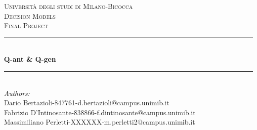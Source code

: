 \begin{titlepage}

\newcommand{\HRule}{\rule{\linewidth}{0.5mm}} %

\center %
 

\textsc{\LARGE Università degli studi di Milano-Bicocca}\\[1cm] %
\textsc{\Large Decision Models}\\[0.3cm] %
\textsc{\large Final Project}\\[0.1cm] %


\HRule \\[0.4cm]
{ \huge \bfseries Q-ant \& Q-gen}\\[0.4cm] %
\HRule \\[1.5cm]
 

\large
\emph{Authors:}\\
Dario Bertazioli-847761-d.bertazioli@campus.unimib.it \\   %
Fabrizio D'Intinosante-838866-f.dintinosante@campus.unimib.it \\
Massimiliano Perletti-XXXXXX-m.perletti2@campus.unimib.it\\[1cm] %




\end{titlepage}

